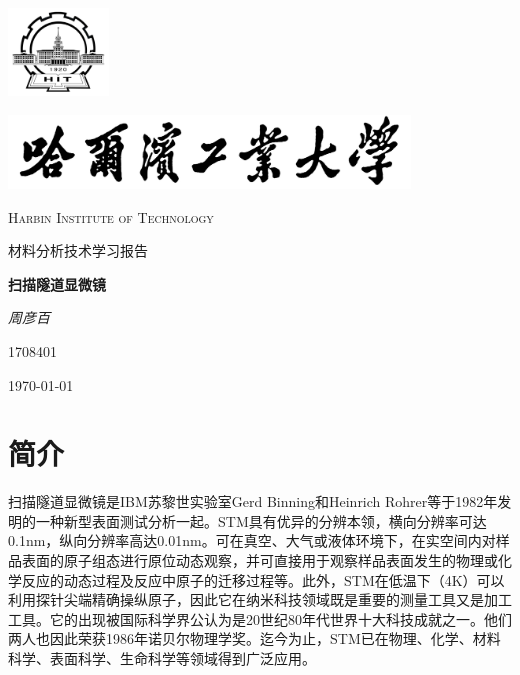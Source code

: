\documentclass[12pt,a4paper]{ctexart}
\author{周彦百}
\begin{document}

\begin{titlepage}
	\centering
	\includegraphics[width=0.2\textwidth]{SchoolLogo}\par
	\vspace{1cm}
	\includegraphics[width=0.8\textwidth]{SchoolName}\par
	\vspace{0.1cm}
	{\scshape\LARGE Harbin Institute of Technology \par}
	\vspace{1cm}
	{\kaishu\LARGE 材料分析技术学习报告\par}
	\vspace{1.5cm}
	{\huge\bfseries 扫描隧道显微镜\par}
	\vspace{2cm}
	{\fangsong\Large\itshape 周彦百 \par}
	\vfill
	{1708401}\par

	\vfill
	{\large \today\par}
\end{titlepage}

\tableofcontents

\vfill

\section{简介}
扫描隧道显微镜是IBM苏黎世实验室Gerd Binning和Heinrich Rohrer等于1982年发明的一种新型表面测试分析一起。STM具有优异的分辨本领，横向分辨率可达0.1nm，纵向分辨率高达0.01nm。可在真空、大气或液体环境下，在实空间内对样品表面的原子组态进行原位动态观察，并可直接用于观察样品表面发生的物理或化学反应的动态过程及反应中原子的迁移过程等。此外，STM在低温下（4K）可以利用探针尖端精确操纵原子，因此它在纳米科技领域既是重要的测量工具又是加工工具。它的出现被国际科学界公认为是20世纪80年代世界十大科技成就之一。他们两人也因此荣获1986年诺贝尔物理学奖。迄今为止，STM已在物理、化学、材料科学、表面科学、生命科学等领域得到广泛应用。
\end{document}
